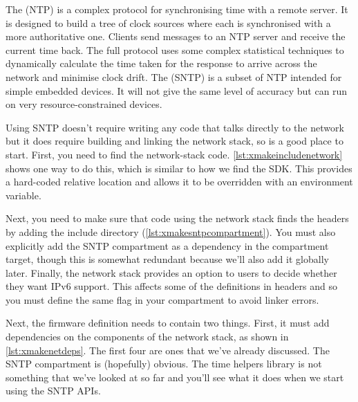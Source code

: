The  (NTP) is a complex protocol for synchronising time with a remote server.
It is designed to build a tree of clock sources where each  is synchronised with a more authoritative one.
Clients send messages to an NTP server and receive the current time back.
The full protocol uses some complex statistical techniques to dynamically calculate the time taken for the response to arrive across the network and minimise clock drift.
The  (SNTP) is a subset of NTP intended for simple embedded devices.
It will not give the same level of accuracy but can run on very resource-constrained devices.

Using SNTP doesn't require writing any code that talks directly to the network but it does require building and linking the network stack, so is a good place to start.
First, you need to find the network-stack code.
\ref{lst:xmakeincludenetwork} shows one way to do this, which is similar to how we find the SDK.
This provides a hard-coded relative location and allows it to be overridden with an environment variable.

\lualisting[filename=examples/sntp/xmake.lua,marker=include_network,label=lst:xmakeincludenetwork,caption="Build system code for including the network stack."]{}

Next, you need to make sure that code using the network stack finds the headers by adding the include directory (\ref{lst:xmakesntpcompartment}).
You must also explicitly add the SNTP compartment as a dependency in the compartment target, though this is somewhat redundant because we'll also add it globally later.
Finally, the network stack provides an option to users to decide whether they want IPv6 support.
This affects some of the definitions in headers and so you must define the same flag in your compartment to avoid linker errors.

\lualisting[filename=examples/sntp/xmake.lua,marker=sntp,label=lst:xmakesntpcompartment,caption="Build system code for building a compartment that uses the network stack."]{}

Next, the firmware definition needs to contain two things.
First, it must add dependencies on the components of the network stack, as shown in \ref{lst:xmakenetdeps}.
The first four are ones that we've already discussed.
The SNTP compartment is (hopefully) obvious.
The time helpers library is not something that we've looked at so far and you'll see what it does when we start using the SNTP APIs.

